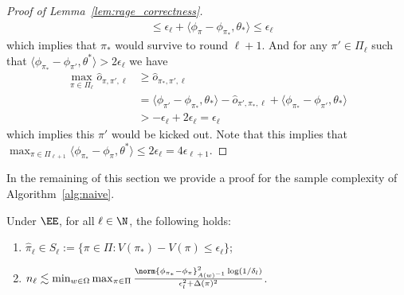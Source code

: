 \documentclass{article}
\newcommand{\kevin}[1]{\textcolor{red}{KGJ:#1}}
\newcommand{\1}{\mathbf{1}}
\begin{document}
\begin{proof}[Proof of Lemma~\ref{lem:rage_correctness}]
\begin{align*}
&\leq \epsilon_\ell + \langle \phi_{\pi} - \phi_{\pi_*},\theta_* \rangle \leq \epsilon_\ell
\end{align*}
which implies that $\pi_*$ would survive to round $\ell+1$.
And for any $\pi' \in \Pi_\ell$ such that $\langle \phi_{\pi_*}-\phi_{\pi'}, \theta^* \rangle > 2 \epsilon_\ell$ we have 
\begin{align*}
\max_{\pi \in \Pi_\ell} \hat{o}_{\pi,\pi',\ell} &\geq \hat{o}_{\pi_*,\pi',\ell} \\
&= \langle \phi_{\pi'} - \phi_{\pi_*},\theta_* \rangle - \hat{o}_{\pi',\pi_*,\ell} + \langle \phi_{\pi_*} - \phi_{\pi'},\theta_* \rangle \\
&> - \epsilon_\ell +  2 \epsilon_\ell = \epsilon_\ell
\end{align*}
which implies this $\pi'$ would be kicked out.
Note that this implies that $\max_{\pi \in \Pi_{\ell+1}} \langle \phi_{\pi_*} - \phi_\pi, \theta^* \rangle \leq 2 \epsilon_\ell = 4 \epsilon_{\ell+1}$.
\end{proof}

In the remaining of this section we provide a proof for the sample complexity of Algorithm~\ref{alg:naive}. 

\begin{theorem}
Under $\EE$, for all $\ell\in\N$, the following holds: 
\begin{enumerate}
    \item $\hat{\pi}_\ell\in S_\ell:=\{\pi\in\Pi: V(\pi_*)-V(\pi)\leq \epsilon_\ell\}$; 
    \item $n_\ell\lesssim \min_{w\in\Omega}\max_{\pi\in\Pi}\frac{\norm{\phi_{\pi_*}-\phi_{\pi}}_{A(w)^{-1}}^2\log(1/\delta_l)}{\epsilon_l^2+\Delta(\pi)^2}$. 
\end{enumerate}
\end{theorem}
\end{document}
